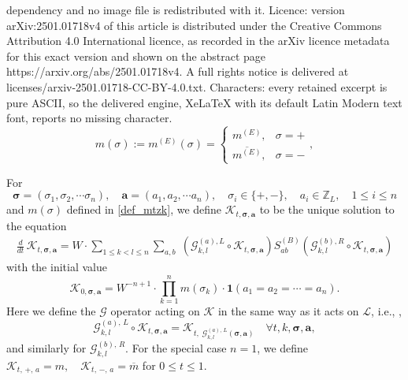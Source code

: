 \documentclass[10pt,a4paper]{amsart}
\newcommand{\be}{\begin{equation}}
\newcommand{\cal}{\mathcal}
\newcommand{\ee}{\end{equation}}
\begin{document}
dependency and no image file is redistributed with it. Licence: version arXiv:2501.01718v4 of this article is distributed under the Creative Commons Attribution 4.0 International licence, as recorded in the arXiv licence metadata for this exact version and shown on the abstract page https://arxiv.org/abs/2501.01718v4. A full rights notice is delivered at licenses/arxiv-2501.01718-CC-BY-4.0.txt. Characters: every retained excerpt is pure ASCII, so the delivered engine, XeLaTeX with its default Latin Modern text font, reports no missing character.
\begin{equation}\label{def_mtzk}
m (\sigma ):=m^{(E)}(\sigma ) = \begin{cases}
     m^{(E)}, & \sigma  =+ \\
     \overline{m^{(E)}} , & \sigma = -
\end{cases},
\end{equation}

\begin{definition}\label{Def_Ktza}
For 
$$
\boldsymbol{\sigma}=(\sigma_1, \sigma_2, \cdots \sigma_n),\quad 
\boldsymbol{a}=(a_1, a_2, \cdots a_n)
,\quad \sigma_i \in \{+,-\}, \quad
a_i\in \mathbb Z_L, \quad 1\le i\le n
$$
and  $m(\sigma)$ defined in \eqref{def_mtzk}, we define  ${\cal K}_{t, \boldsymbol{\sigma}, \textbf{a}}$ to be the unique solution to the equation 
 \begin{align}\label{pro_dyncalK}
       \frac{d}{dt}\,{\cal K}_{t, \boldsymbol{\sigma}, \textbf{a}} 
       =  
       {W}\cdot  \sum_{1 \le k < l \le n} \sum_{a, b} \; \left( {\cal G}^{(a), L}_{k, l} \circ {\cal K}_{t, \boldsymbol{\sigma}, \textbf{a}} \right) S^{(B)}_{ab} \left( {\cal G}^{(b), R}_{k, l} \circ {\cal K}_{t, \boldsymbol{\sigma}, \textbf{a}} \right)  
    \end{align}
with the initial value 
$$
    {\cal K}_{0, \boldsymbol{\sigma}, \textbf{a}} =  {W^{-n+1}} \cdot \prod_{k=1}^n m (\sigma_k) \cdot \textbf{1}(a_1 = a_2 = \cdots = a_n).
$$
Here we define the ${\cal G}$ operator acting on ${\cal K}$ in the same way as it acts on ${\cal L}$,  i.e., ,  
  \be\label{calGonIND}
     {\cal G}^{(a),\,L }_{k,l}  \circ {\cal K}_{t, \boldsymbol{\sigma}, \textbf{a}} = {\cal K}_{t, \; {\cal G}^{(a),\,L }_{k,l}  (\boldsymbol{\sigma}, \textbf{a})}  \quad \forall t, k, \boldsymbol{\sigma}, \textbf{a},   
       \ee
and similarly for  ${\cal G}^{(b),\, R }_{k,l}$. 
For the special case $n=1$, we define %
$
{\cal K}_{t,\,+,\, a}=m,\quad {\cal K}_{t,\,-,\, a}=\overline m$ for $0\le t\le 1$. 
\end{definition}
\end{document}
